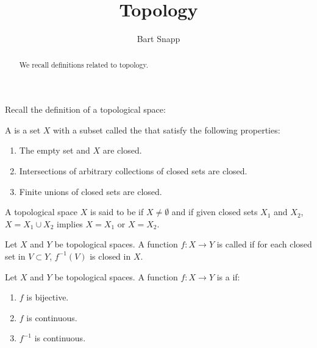 \documentclass{ximera}
\author{Bart Snapp}
\title{Topology}
\begin{document}
\begin{abstract}
  We recall definitions related to topology. 
\end{abstract}
\maketitle

Recall the definition of a topological space:

\begin{definition}
  A  is a set $X$ with a subset called the
   that satisfy the following properties:
  \begin{enumerate}
  \item The empty set and $X$ are closed.
  \item Intersections of arbitrary collections of closed sets are
    closed.
  \item Finite unions of closed sets are closed.
  \end{enumerate}
\end{definition}


\begin{definition}
  A topological space $X$ is said to be  if $X\ne
  \emptyset$ and if given closed sets $X_1$ and $X_2$, $X=X_1\cup X_2$
  implies $X=X_1$ or $X=X_2$.
\end{definition}




\begin{definition}
  Let $X$ and $Y$ be topological spaces. A function $f:X\to Y$ is
  called  if for each closed set in $V \subset Y$,
  $f^{-1}(V)$ is closed in $X$.
\end{definition}



\begin{definition}
  Let $X$ and $Y$ be topological spaces. A function $f:X\to Y$ is a
   if:
  \begin{enumerate}
  \item $f$ is bijective.
  \item $f$ is continuous.
  \item $f^{-1}$ is continuous.
  \end{enumerate}
\end{definition}
\end{document}
